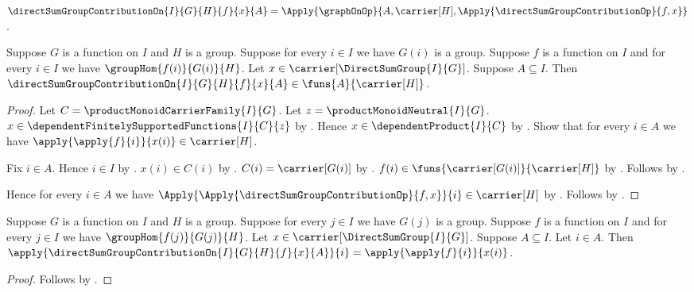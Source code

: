 \begin{definition}\label{direct_sum_group_contribution_on}
    $\directSumGroupContributionOn{I}{G}{H}{f}{x}{A}
        =\Apply{\graphOnOp}{
            A,\carrier[H],
            \Apply{\directSumGroupContributionOp}{f,x}}$.
\end{definition}

\begin{proposition}\label{direct_sum_group_contribution_on_type}
    Suppose $G$ is a function on $I$ and $H$ is a group.
    Suppose for every $i\in I$ we have $G(i)$ is a group.
    Suppose $f$ is a function on $I$ and
        for every $i\in I$ we have $\groupHom{f(i)}{G(i)}{H}$.
    Let $x\in\carrier[\DirectSumGroup{I}{G}]$.
    Suppose $A\subseteq I$.
    Then
        $\directSumGroupContributionOn{I}{G}{H}{f}{x}{A}
            \in\funs{A}{\carrier[H]}$.
\end{proposition}
\begin{proof}
    Let $C=\productMonoidCarrierFamily{I}{G}$.
    Let $z=\productMonoidNeutral{I}{G}$.
    $x\in\dependentFinitelySupportedFunctions{I}{C}{z}$ by
        .
    Hence $x\in\dependentProduct{I}{C}$ by
        .
    Show that for every $i\in A$ we have
        $\apply{\apply{f}{i}}{x(i)}\in\carrier[H]$.
    \begin{subproof}
        Fix $i\in A$.
        Hence $i\in I$ by .
        $x(i)\in C(i)$ by .
        $C(i)=\carrier[G(i)]$ by
            .
        $f(i)\in\funs{\carrier[G(i)]}{\carrier[H]}$ by
            .
        Follows by .
    \end{subproof}
    Hence for every $i\in A$ we have
        $\Apply{\Apply{\directSumGroupContributionOp}{f,x}}{i}
            \in\carrier[H]$ by
        .
    Follows by
        .
\end{proof}

\begin{proposition}\label{direct_sum_group_contribution_on_apply}
    Suppose $G$ is a function on $I$ and $H$ is a group.
    Suppose for every $j\in I$ we have $G(j)$ is a group.
    Suppose $f$ is a function on $I$ and
        for every $j\in I$ we have $\groupHom{f(j)}{G(j)}{H}$.
    Let $x\in\carrier[\DirectSumGroup{I}{G}]$.
    Suppose $A\subseteq I$.
    Let $i\in A$.
    Then
        $\apply{\directSumGroupContributionOn{I}{G}{H}{f}{x}{A}}{i}
            =\apply{\apply{f}{i}}{x(i)}$.
\end{proposition}
\begin{proof}
    Follows by
        .
\end{proof}


